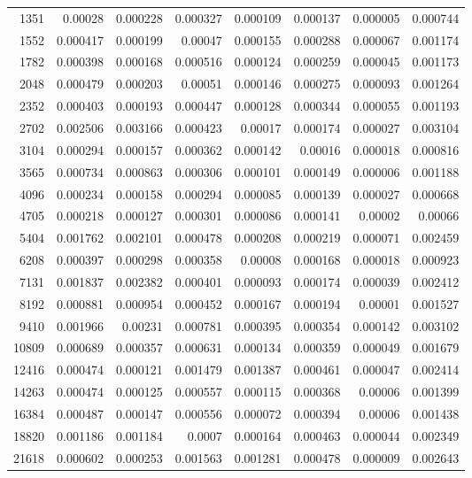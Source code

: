 \begin{longtable}{r r r r r r r r}
1351 & 0.00028 & 0.000228 & 0.000327 & 0.000109 & 0.000137 & 0.000005 & 0.000744 \\
1552 & 0.000417 & 0.000199 & 0.00047 & 0.000155 & 0.000288 & 0.000067 & 0.001174 \\
1782 & 0.000398 & 0.000168 & 0.000516 & 0.000124 & 0.000259 & 0.000045 & 0.001173 \\
2048 & 0.000479 & 0.000203 & 0.00051 & 0.000146 & 0.000275 & 0.000093 & 0.001264 \\
2352 & 0.000403 & 0.000193 & 0.000447 & 0.000128 & 0.000344 & 0.000055 & 0.001193 \\
2702 & 0.002506 & 0.003166 & 0.000423 & 0.00017 & 0.000174 & 0.000027 & 0.003104 \\
3104 & 0.000294 & 0.000157 & 0.000362 & 0.000142 & 0.00016 & 0.000018 & 0.000816 \\
3565 & 0.000734 & 0.000863 & 0.000306 & 0.000101 & 0.000149 & 0.000006 & 0.001188 \\
4096 & 0.000234 & 0.000158 & 0.000294 & 0.000085 & 0.000139 & 0.000027 & 0.000668 \\
4705 & 0.000218 & 0.000127 & 0.000301 & 0.000086 & 0.000141 & 0.00002 & 0.00066 \\
5404 & 0.001762 & 0.002101 & 0.000478 & 0.000208 & 0.000219 & 0.000071 & 0.002459 \\
6208 & 0.000397 & 0.000298 & 0.000358 & 0.00008 & 0.000168 & 0.000018 & 0.000923 \\
7131 & 0.001837 & 0.002382 & 0.000401 & 0.000093 & 0.000174 & 0.000039 & 0.002412 \\
8192 & 0.000881 & 0.000954 & 0.000452 & 0.000167 & 0.000194 & 0.00001 & 0.001527 \\
9410 & 0.001966 & 0.00231 & 0.000781 & 0.000395 & 0.000354 & 0.000142 & 0.003102 \\
10809 & 0.000689 & 0.000357 & 0.000631 & 0.000134 & 0.000359 & 0.000049 & 0.001679 \\
12416 & 0.000474 & 0.000121 & 0.001479 & 0.001387 & 0.000461 & 0.000047 & 0.002414 \\
14263 & 0.000474 & 0.000125 & 0.000557 & 0.000115 & 0.000368 & 0.00006 & 0.001399 \\
16384 & 0.000487 & 0.000147 & 0.000556 & 0.000072 & 0.000394 & 0.00006 & 0.001438 \\
18820 & 0.001186 & 0.001184 & 0.0007 & 0.000164 & 0.000463 & 0.000044 & 0.002349 \\
21618 & 0.000602 & 0.000253 & 0.001563 & 0.001281 & 0.000478 & 0.000009 & 0.002643 \\

\end{longtable}
